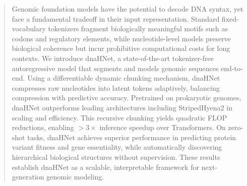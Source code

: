 \documentclass{article}
\theoremstyle{plain}
\theoremstyle{definition}
\theoremstyle{remark}
\begin{document}
\begin{abstract}
Genomic foundation models have the potential to decode DNA syntax, yet face a fundamental tradeoff in their input representation. Standard fixed-vocabulary tokenizers fragment biologically meaningful motifs such as codons and regulatory elements, while nucleotide-level models preserve biological coherence but incur prohibitive computational costs for long contexts. We introduce dnaHNet, a state-of-the-art tokenizer-free autoregressive model that segments and models genomic sequences end-to-end. Using a differentiable dynamic chunking mechanism, dnaHNet compresses raw nucleotides into latent tokens adaptively, balancing compression with predictive accuracy. Pretrained on prokaryotic genomes, dnaHNet outperforms leading architectures including StripedHyena2 in scaling and efficiency. This recursive chunking yields quadratic FLOP reductions, enabling $>3 \times$ inference speedup over Transformers. On zero-shot tasks, dnaHNet achieves superior performance in predicting protein variant fitness and gene essentiality, while automatically discovering hierarchical biological structures without supervision. These results establish dnaHNet as a scalable, interpretable framework for next-generation genomic modeling.
\end{abstract}

\end{document}
